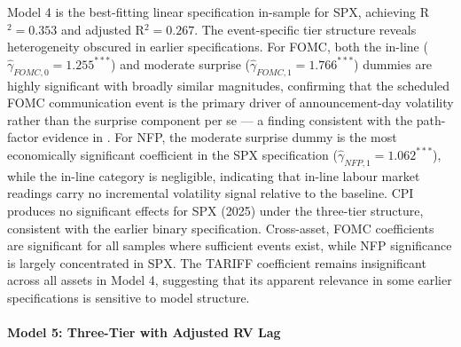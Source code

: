 \documentclass[12pt,a4paper]{report}
\begin{document}
Model 4 is the best-fitting linear specification in-sample for SPX, achieving R$^2 = 0.353$ and adjusted R$^2 = 0.267$. The event-specific tier structure reveals heterogeneity obscured in earlier specifications. For FOMC, both the in-line ($\hat{\gamma}_{FOMC,0} = 1.255^{***}$) and moderate surprise ($\hat{\gamma}_{FOMC,1} = 1.766^{***}$) dummies are highly significant with broadly similar magnitudes, confirming that the scheduled FOMC communication event is the primary driver of announcement-day volatility rather than the surprise component per se --- a finding consistent with the path-factor evidence in \citet{Gurkaynak2005}. For NFP, the moderate surprise dummy is the most economically significant coefficient in the SPX specification ($\hat{\gamma}_{NFP,1} = 1.062^{***}$), while the in-line category is negligible, indicating that in-line labour market readings carry no incremental volatility signal relative to the baseline. CPI produces no significant effects for SPX (2025) under the three-tier structure, consistent with the earlier binary specification. Cross-asset, FOMC coefficients are significant for all samples where sufficient events exist, while NFP significance is largely concentrated in SPX. The TARIFF coefficient remains insignificant across all assets in Model 4, suggesting that its apparent relevance in some earlier specifications is sensitive to model structure.

\paragraph{Model 5: Three-Tier with Adjusted RV Lag}\mbox{}\\
\end{document}
